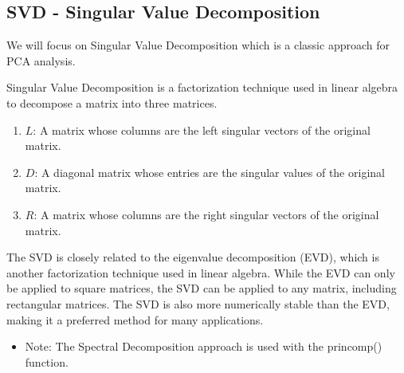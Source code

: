 \documentclass[
  letterpaper,
  DIV=11,
  numbers=noendperiod]{scrreprt}
\newenvironment{Shaded}{\begin{snugshade}}{\end{snugshade}}
\newcommand{\AttributeTok}[1]{\textcolor[rgb]{0.40,0.45,0.13}{#1}}
\newcommand{\CommentTok}[1]{\textcolor[rgb]{0.37,0.37,0.37}{#1}}
\newcommand{\ConstantTok}[1]{\textcolor[rgb]{0.56,0.35,0.01}{#1}}
\newcommand{\DecValTok}[1]{\textcolor[rgb]{0.68,0.00,0.00}{#1}}
\newcommand{\FunctionTok}[1]{\textcolor[rgb]{0.28,0.35,0.67}{#1}}
\newcommand{\NormalTok}[1]{\textcolor[rgb]{0.00,0.23,0.31}{#1}}
\newcommand{\OtherTok}[1]{\textcolor[rgb]{0.00,0.23,0.31}{#1}}
\newcommand{\SpecialCharTok}[1]{\textcolor[rgb]{0.37,0.37,0.37}{#1}}
\newcommand{\StringTok}[1]{\textcolor[rgb]{0.13,0.47,0.30}{#1}}
\providecommand{\tightlist}{%
  \setlength{\itemsep}{0pt}\setlength{\parskip}{0pt}}\usepackage{longtable,booktabs,array}
\begin{document}
\hypertarget{svd---singular-value-decomposition}{%
\subsection{SVD - Singular Value
Decomposition}\label{svd---singular-value-decomposition}}

We will focus on Singular Value Decomposition which is a classic
approach for PCA analysis.

Singular Value Decomposition is a factorization technique used in linear
algebra to decompose a matrix into three matrices.

\begin{enumerate}
\def\labelenumi{\arabic{enumi}.}
\item
  \(L\): A matrix whose columns are the left singular vectors of the
  original matrix.
\item
  \(D\): A diagonal matrix whose entries are the singular values of the
  original matrix.
\item
  \(R\): A matrix whose columns are the right singular vectors of the
  original matrix.
\end{enumerate}

The SVD is closely related to the eigenvalue decomposition (EVD), which
is another factorization technique used in linear algebra. While the EVD
can only be applied to square matrices, the SVD can be applied to any
matrix, including rectangular matrices. The SVD is also more numerically
stable than the EVD, making it a preferred method for many applications.

\begin{itemize}
\tightlist
\item
  Note: The Spectral Decomposition approach is used with the princomp()
  function.
\end{itemize}

\begin{Shaded}
\end{Shaded}
\end{document}
